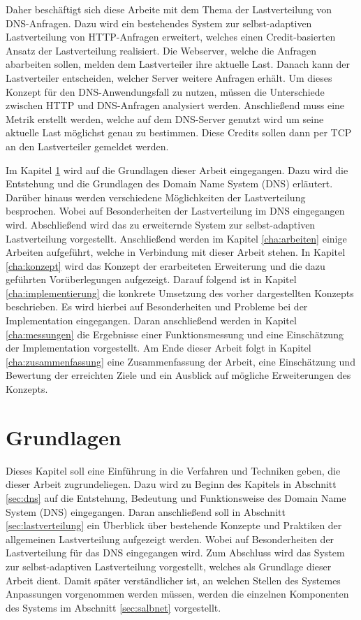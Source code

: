 \documentclass[a4paper, 12pt, BCOR10mm, DIV12, toc=bibliography, toc=listof, german]{scrbook}
\def \dns {Domain Name System (DNS)}
\begin{document}
		Daher beschäftigt sich diese Arbeite mit dem Thema der Lastverteilung von DNS-Anfragen. Dazu
		wird ein bestehendes System \cite{scsczile2008} zur selbst-adaptiven Lastverteilung von
		HTTP-Anfragen erweitert, welches einen Credit-basierten Ansatz der Lastverteilung realisiert.
		Die Webserver, welche die Anfragen abarbeiten sollen, melden dem Lastverteiler ihre aktuelle
		Last.  Danach kann der Lastverteiler entscheiden, welcher Server weitere Anfragen erhält. Um
		dieses Konzept für den DNS-Anwendungsfall zu nutzen, müssen die Unterschiede zwischen HTTP und
		DNS-Anfragen analysiert werden. Anschließend muss eine Metrik erstellt werden, welche auf dem
		DNS-Server genutzt wird um seine aktuelle Last möglichst genau zu bestimmen. Diese Credits
		sollen dann per TCP an den Lastverteiler gemeldet werden.

		Im Kapitel \ref{cha:grundlagen} wird auf die Grundlagen dieser Arbeit eingegangen. Dazu wird die
		Entstehung und die Grundlagen des \dns{} erläutert. Darüber hinaus werden verschiedene
		Möglichkeiten der Lastverteilung besprochen. Wobei auf Besonderheiten der Lastverteilung im DNS
		eingegangen wird. Abschließend wird das zu erweiternde System zur selbst-adaptiven
		Lastverteilung vorgestellt. Anschließend werden im Kapitel \ref{cha:arbeiten} einige Arbeiten
		aufgeführt, welche in Verbindung mit dieser Arbeit stehen. In Kapitel \ref{cha:konzept} wird das
		Konzept der erarbeiteten Erweiterung und die dazu geführten Vorüberlegungen aufgezeigt.  Darauf
		folgend ist in Kapitel \ref{cha:implementierung} die konkrete Umsetzung des vorher dargestellten
		Konzepts beschrieben. Es wird hierbei auf Besonderheiten und Probleme bei der Implementation
		eingegangen. Daran anschließend werden in Kapitel \ref{cha:messungen} die Ergebnisse einer
		Funktionsmessung und eine Einschätzung der Implementation vorgestellt. Am Ende dieser Arbeit
		folgt in Kapitel \ref{cha:zusammenfassung} eine Zusammenfassung der Arbeit, eine Einschätzung
		und Bewertung der erreichten Ziele und ein Ausblick auf mögliche Erweiterungen des Konzepts.


	\chapter{Grundlagen} %
	\label{cha:grundlagen}

		Dieses Kapitel soll eine Einführung in die Verfahren und Techniken geben, die dieser Arbeit
		zugrundeliegen.  Dazu wird zu Beginn des Kapitels in Abschnitt \ref{sec:dns} auf die Entstehung,
		Bedeutung und Funktionsweise des \dns{} eingegangen. Daran anschließend soll in Abschnitt
		\ref{sec:lastverteilung} ein Überblick über bestehende Konzepte und Praktiken der allgemeinen
		Lastverteilung aufgezeigt werden. Wobei auf Besonderheiten der Lastverteilung für das DNS
		eingegangen wird. Zum Abschluss wird das System zur selbst-adaptiven Lastverteilung vorgestellt,
		welches als Grundlage dieser Arbeit dient. Damit später verständlicher ist, an welchen
		Stellen des Systemes Anpassungen vorgenommen werden müssen, werden die einzelnen Komponenten des
		Systems im Abschnitt \ref{sec:salbnet} vorgestellt.		
\end{document}
